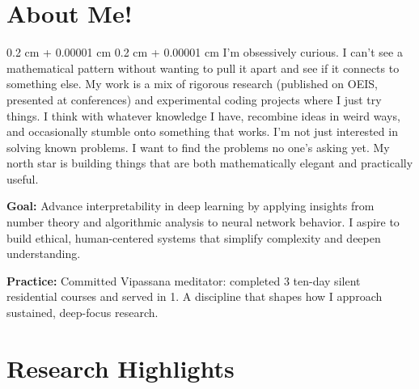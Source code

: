 \documentclass[10pt, letterpaper]{article}
\newenvironment{onecolentry}{
    \begin{adjustwidth}{
        0.2 cm + 0.00001 cm
    }{
        0.2 cm + 0.00001 cm
    }
}{
    \end{adjustwidth}
} %
\begin{document}
    \vspace{0.3 cm - 0.3 cm}



\section{About Me!}

        \begin{onecolentry}{
            I'm obsessively curious. I can't see a mathematical pattern without wanting to pull it apart and see if it connects to something else. My work is a mix of rigorous research (published on OEIS, presented at conferences) and experimental coding projects where I just try things. I think with whatever knowledge I have, recombine ideas in weird ways, and occasionally stumble onto something that works. I'm not just interested in solving known problems. I want to find the problems no one's asking yet. My north star is building things that are both mathematically elegant and practically useful.}

            \textbf{Goal:} Advance interpretability in deep learning by applying insights from number theory and algorithmic analysis to neural network behavior. I aspire to build ethical, human-centered systems that simplify complexity and deepen understanding.

            \textbf{Practice:} Committed Vipassana meditator: completed 3 ten-day silent residential courses and served in 1. A discipline that shapes how I approach sustained, deep-focus research.
        \end{onecolentry}
        
\section{Research Highlights}
\end{document}
